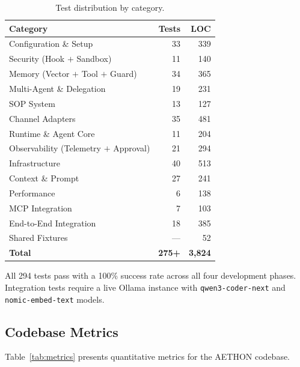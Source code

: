 \documentclass[9pt,twocolumn,letterpaper]{extarticle}
\begin{document}
\begin{table}[t]
\caption{Test distribution by category.}
\label{tab:tests}
\centering
\small
\begin{tabular}{@{}lrr@{}}
\toprule
\textbf{Category} & \textbf{Tests} & \textbf{LOC} \\
\midrule
Configuration \& Setup          & 33  & 339 \\
Security (Hook $+$ Sandbox)     & 11  & 140 \\
Memory (Vector $+$ Tool $+$ Guard) & 34  & 365 \\
Multi-Agent \& Delegation       & 19  & 231 \\
SOP System                      & 13  & 127 \\
Channel Adapters                & 35  & 481 \\
Runtime \& Agent Core           & 11  & 204 \\
Observability (Telemetry $+$ Approval) & 21  & 294 \\
Infrastructure                  & 40  & 513 \\
Context \& Prompt               & 27  & 241 \\
Performance                     & 6   & 138 \\
MCP Integration                 & 7   & 103 \\
End-to-End Integration          & 18  & 385 \\
Shared Fixtures                 & --- & 52  \\
\midrule
\textbf{Total}                  & \textbf{275+} & \textbf{3{,}824} \\
\bottomrule
\end{tabular}
\end{table}

All 294 tests pass with a 100\% success rate across all four development phases.
Integration tests require a live Ollama instance with \texttt{qwen3-coder-next} and \texttt{nomic-embed-text} models.

\subsection{Codebase Metrics}

Table~\ref{tab:metrics} presents quantitative metrics for the AETHON codebase.
\end{document}
